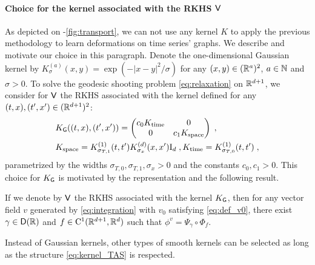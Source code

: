     \paragraph{Choice for the kernel associated with the RKHS $\mathsf{V}$}
    \label{paragraph:kernel_V}
    As depicted on -\ref{fig:transport}, we can not use any kernel $K$ to apply the previous methodology to learn deformations on time series' graphs.
    We describe and motivate our choice in this paragraph.
     Denote the one-dimensional Gaussian kernel by $K_\sigma^{(a)}(x,y)=\exp(-|x-y|^2/\sigma)$ for any $(x,y)\in (\mathbb{R}^a)^2$, $a\in \mathbb{N}$ and $\sigma>0$.
    To solve the geodesic shooting problem \eqref{eq:relaxation} on $\mathbb{R}^{d+1}$, we consider for $\mathsf{V}$ the RKHS associated with the kernel defined for any $(t,x),(t',x')\in (\mathbb{R}^{d+1})^2$:
    \begin{align}
      \label{eq:kernel_TAS}
      &K_{\mathsf{G}}((t,x),(t',x'))=\begin{pmatrix}
        c_0K_{\text{time}} & 0 \\
        0 & c_1 K_{\text{space}} 
        \end{pmatrix} \; ,\\
       & K_{\text{space}}=K_{\sigma_{T,1}}^{(1)}(t,t')K_{\sigma_x}^{(d)}(x,x') \mathrm{I}_d\;,K_{\text{time}}=K_{\sigma_{T,0}}^{(1)}(t,t') \;,
    \end{align}
    parametrized by the widths $\sigma_{T,0},\sigma_{T,1},\sigma_x>0$ and the constants $c_0,c_1>0$.
This choice for $K_{\mathsf{G}}$ is motivated by the representation  and the following result. 
    \begin{lemma}
      \label{lemma:choice_of_kernel_V}
      If we denote by $\mathsf{V}$ the RKHS associated with the kernel $K_{\mathsf{G}}$, then for any vector field $v$ generated by \eqref{eq:integration} with $v_0$ satisfying \eqref{eq:def_v0},
       there exist $\gamma \in \mathsf{D}(\mathbb{R}) $ and $f\in \mathrm{C}^1(\mathbb{R}^{d+1},\mathbb{R}^d)$ such that $\phi^v=\Psi_\gamma\circ\Phi_f $.
    \end{lemma}
    Instead of Gaussian kernels, other types of smooth kernels can be selected as long as the structure \eqref{eq:kernel_TAS} is respected.
